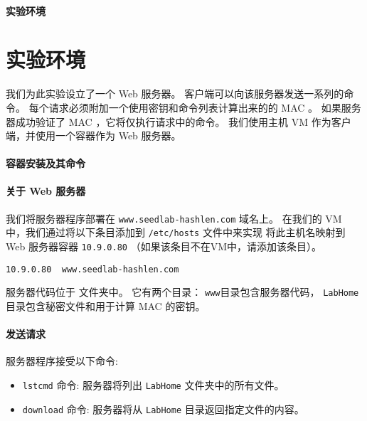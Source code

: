 \paragraph{实验环境}
\seedenvironmentB
\nodependency




\section{实验环境}

我们为此实验设立了一个 Web 服务器。
客户端可以向该服务器发送一系列的命令。
每个请求必须附加一个使用密钥和命令列表计算出来的的 MAC 。
如果服务器成功验证了 MAC ，它将仅执行请求中的命令。
我们使用主机 VM 作为客户端，并使用一个容器作为 Web 服务器。


\paragraph{容器安装及其命令}




\paragraph{关于 Web 服务器}
我们将服务器程序部署在 \texttt{www.seedlab-hashlen.com} 域名上。
在我们的 VM 中，我们通过将以下条目添加到 \texttt{/etc/hosts} 文件中来实现
将此主机名映射到 Web 服务器容器 \texttt{10.9.0.80}
（如果该条目不在VM中，请添加该条目）。

\begin{lstlisting}
10.9.0.80  www.seedlab-hashlen.com
\end{lstlisting}


服务器代码位于  文件夹中。
它有两个目录：
\texttt{www}目录包含服务器代码，
\texttt{LabHome} 目录包含秘密文件和用于计算 MAC 的密钥。




\paragraph{发送请求} 服务器程序接受以下命令:

\begin{itemize}
   \item \texttt{lstcmd} 命令:
         服务器将列出 \texttt{LabHome} 文件夹中的所有文件。
   \item \texttt{download} 命令:
         服务器将从 \texttt{LabHome} 目录返回指定文件的内容。
\end{itemize}

